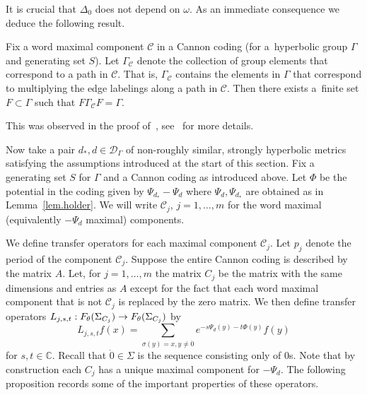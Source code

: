 \documentclass[AHL,Unicode,longabstracts,published]{cedram}
\newcommand{\G}{\Gamma}
\newcommand{\D}{\Delta}
\renewcommand{\o}{\omega}
\renewcommand{\SS}{\Sigma}
\newcommand{\Cc}{\mathcal{C}}
\newcommand{\Dc}{\mathcal{D}}
\newcommand{\C}{\mathbb{C}}
\renewcommand*{\to}{\mathchoice{\longrightarrow}{\rightarrow}{\rightarrow}{\rightarrow}}
\theoremstyle{plain}
\newcommand{\G}{\Gamma}
\begin{document}
It is crucial that $\D_0$ does not depend on $\o$. As an immediate consequence we deduce the following result.

\begin{lemm}\label{lem.gqt}
Fix a word maximal component $\Cc$ in a Cannon coding (for a~hyperbolic group $\G$ and generating set $S$). Let $\G_\Cc$ denote the collection of group elements that correspond to a path in $\Cc$. That is, $\G_\Cc$ contains the elements in $\G$ that correspond to multiplying the edge labelings along a path in $\Cc$. Then there exists a~finite set $F \subset \G$ such that $F \G_\Cc F = \G$.
\end{lemm}

This was observed in the proof of~\cite[Lemma~4.6]{GMM2018}, see~\cite[Section~4.5]{cantrell.tanaka.1} for more details.


Now take a pair $d_\ast, d \in \Dc_\G$ of non-roughly similar, strongly hyperbolic metrics satisfying the assumptions introduced at the start of this section. Fix a generating set $S$ for $\G$ and a Cannon coding as introduced above. Let $\Phi$ be the potential in the coding given by $\Psi_{d_\ast} - \Psi_d$ where $\Psi_d, \Psi_{d_\ast}$ are obtained as in Lemma~\ref{lem.holder}. We will write $\Cc_j$, $j=1,\dots, m$ for the word maximal (equivalently $-\Psi_d$ maximal) components.

We define transfer operators for each maximal component $\Cc_j$. Let $p_j$ denote the period of the component $\Cc_j$. Suppose the entire Cannon coding is described by the matrix $A$. Let, for $j=1, \dots, m$ the matrix $C_j$ be the matrix with the same dimensions and entries as $A$ except for the fact that each word maximal component that is not $\Cc_j$ is replaced by the zero matrix. We then define transfer operators $L_{j,s, t}: F_\theta(\Sigma_{C_j}) \to F_\theta(\Sigma_{C_j}) $ by
\[
L_{j,s,t} f(x) = \sum_{\sigma(y) = x, y \neq \dot{0}} e^{-s\Psi_d(y) - t\Phi(y)} f(y)
\]
for $s, t \in \C$. Recall that $\dot{0} \in \SS$ is the sequence consisting only of $0$s. Note that by construction each $C_j$ has a unique maximal component for $- \Psi_d$. The following proposition records some of the important properties of these operators.
\end{document}
